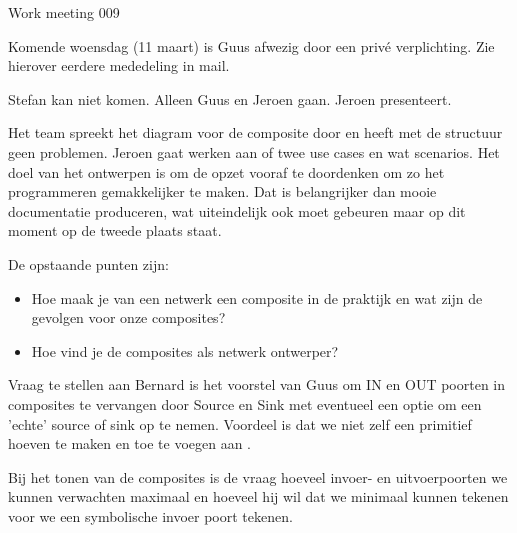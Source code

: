 \documentclass[a4paper,final]{article}
\begin{document}
\begin{Minutes}{Work meeting 009}
\subtitle{Update iteratie 4 met Bernard}

\maketitle%


Komende woensdag (11 maart) is Guus afwezig door een priv\'{e} verplichting. Zie hierover 
eerdere mededeling in mail.


Stefan kan niet komen. Alleen Guus en Jeroen gaan. Jeroen presenteert.


Het team spreekt het \uml diagram voor de composite door en heeft met de 
structuur geen problemen. Jeroen gaat werken aan \een of twee use cases
en wat scenarios. Het doel van het ontwerpen is om de opzet vooraf te doordenken
om zo het programmeren gemakkelijker te maken. Dat is belangrijker dan 
mooie documentatie produceren, wat uiteindelijk ook moet gebeuren maar op dit 
moment op de tweede plaats staat.

De opstaande punten zijn:

\begin{itemize}
	\item Hoe maak je van een netwerk een composite in de praktijk en wat zijn
			de gevolgen voor onze composites?
	\item Hoe vind je de composites als netwerk ontwerper?
\end{itemize}



Vraag te stellen aan Bernard is het voorstel van Guus om IN en OUT poorten
in composites te vervangen door Source en Sink met eventueel een optie om een 
'echte' source of sink op te nemen. Voordeel is dat we niet zelf een primitief 
hoeven te maken en toe te voegen aan .

Bij het tonen van de composites is de vraag hoeveel invoer- en uitvoerpoorten
we kunnen verwachten maximaal en hoeveel hij wil dat we minimaal kunnen tekenen
voor we een symbolische invoer poort tekenen.


\end{Minutes}
\end{document}
